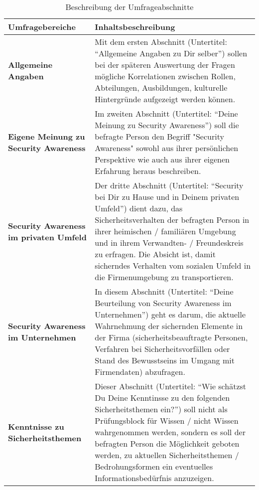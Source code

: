 \documentclass[../../main.tex]{subfiles}
\begin{document}
\begin{table}[H]
\tablefontsize	
\centering
\caption{Beschreibung der Umfrageabschnitte}
\label{Beschreibung der Umfrageabschnitte}
\begin{tabular}{ |p{3cm}|p{12.5cm}|}

\hline
\tableheaderbgcolor
\textbf{Umfragebereiche} & \textbf{Inhaltsbeschreibung} \\ 

\hline
\textbf{Allgemeine \newline Angaben}                &  Mit dem ersten Abschnitt (Untertitel: "`Allgemeine Angaben zu Dir selber"') sollen bei der späteren Auswertung der Fragen mögliche Korrelationen zwischen Rollen, Abteilungen, Ausbildungen, kulturelle Hintergründe aufgezeigt werden können. \\

\hline
\textbf{Eigene Meinung zu \newline Security Awareness}                &  Im zweiten Abschnitt (Untertitel: "`Deine Meinung zu Security Awareness"') soll die befragte Person den Begriff "Security Awareness" sowohl aus ihrer persönlichen Perspektive wie auch aus ihrer eigenen Erfahrung heraus beschreiben.  \\

\hline
\textbf{Security Awareness \newline im privaten Umfeld}                &  Der dritte Abschnitt (Untertitel: "`Security bei Dir zu Hause und in Deinem privaten Umfeld"') dient dazu, das Sicherheitsverhalten der befragten Person in ihrer heimischen / familiären Umgebung und in ihrem Verwandten- / Freundeskreis zu erfragen. Die Absicht ist, damit sicherndes Verhalten vom sozialen Umfeld in die Firmenumgebung zu transportieren. \\

\hline
\textbf{Security Awareness \newline im Unternehmen}                &  In diesem Abschnitt (Untertitel: "`Deine Beurteilung von Security Awareness im Unternehmen"') geht es darum, die aktuelle Wahrnehmung der sichernden Elemente in der Firma (sicherheitsbeauftragte Personen, Verfahren bei Sicherheitsvorfällen oder Stand des Bewusstseins im Umgang mit Firmendaten) abzufragen. \\

\hline
\textbf{Kenntnisse zu \newline Sicherheitsthemen}                &  Dieser Abschnitt (Untertitel: "`Wie schätzst Du Deine Kenntinsse zu den folgenden Sicherheitsthemen ein?"') soll nicht als Prüfungsblock für Wissen / nicht Wissen wahrgenommen werden, sondern es soll der befragten Person die Möglichkeit geboten werden, zu aktuellen Sicherheitsthemen / Bedrohungsformen ein eventuelles Informationsbedürfnis anzuzeigen. \\


\end{tabular}
\end{table}
\end{document}
